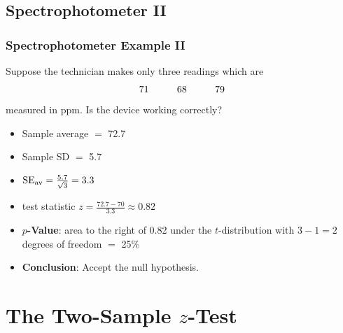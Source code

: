 \documentclass[t]{beamer}
\begin{document}
\subsection{Spectrophotometer II}
\begin{frame}
\frametitle{Spectrophotometer Example II}

{\small

Suppose the technician makes only three readings which are\vspace{-5pt}
\[71 \hspace{.4in} 68\hspace{.4in} 79\vspace{-8pt}\]
measured in ppm.  Is the device working correctly?
\begin{itemize}
\item  Sample average $=$ 72.7
\item  Sample SD $=$ 5.7
\item  $\mbox{SE}_{\mbox{\scriptsize av}} = \frac{5.7}{\sqrt{3}} = 3.3$
\item test statistic $\displaystyle z =\frac{72.7 - 70}{3.3} \approx 0.82$
\item \textbf{\color{blue}$p$-Value}: area to the right of 0.82 under the $t$-distribution with $3-1 = 2$
     degrees of freedom $=$ 25\%
\item \textbf{\color{blue}Conclusion}: Accept the null hypothesis.
\end{itemize}}

\end{frame}

\section{The Two-Sample $z$-Test}
\end{document}
